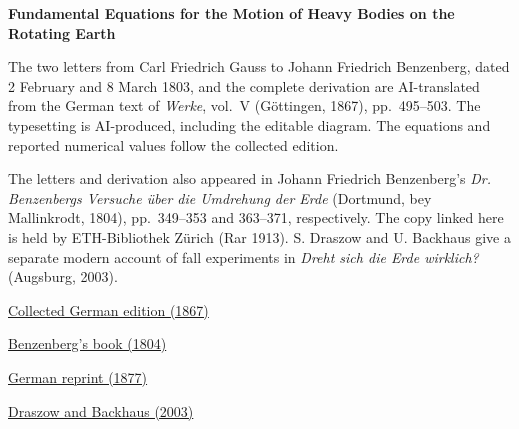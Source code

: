 \clearpage
\thispagestyle{empty}
\begin{center}\Large\textbf{Fundamental Equations for the Motion of Heavy Bodies on the Rotating Earth}\end{center}

The two letters from Carl Friedrich Gauss to Johann Friedrich Benzenberg, dated 2 February and 8 March 1803, and the complete derivation are AI-translated from the German text of \textit{Werke}, vol.~V (Göttingen, 1867), pp.~495--503. The typesetting is AI-produced, including the editable diagram. The equations and reported numerical values follow the collected edition.

The letters and derivation also appeared in Johann Friedrich Benzenberg’s \textit{Dr. Benzenbergs Versuche über die Umdrehung der Erde} (Dortmund, bey Mallinkrodt, 1804), pp.~349--353 and 363--371, respectively. The copy linked here is held by ETH-Bibliothek Zürich (Rar 1913). S. Draszow and U. Backhaus give a separate modern account of fall experiments in \textit{Dreht sich die Erde wirklich?} (Augsburg, 2003).

\medskip\noindent
\href{https://gdz.sub.uni-goettingen.de/id/PPN236006339}{Collected German edition (1867)}\par
\noindent\href{https://doi.org/10.3931/e-rara-14813}{Benzenberg’s book (1804)}\par
\noindent\href{https://doi.org/10.1007/978-3-642-49319-5_23}{German reprint (1877)}\par
\noindent\href{https://www.didaktik.physik.uni-due.de/backhaus/publicat/FallversucheDPG.pdf}{Draszow and Backhaus (2003)}
\clearpage
